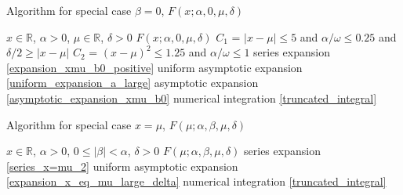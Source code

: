 \documentclass[10pt,a4paper,oneside]{article}
\numberwithin{equation}{section}
\begin{document}
{\centering
\begin{minipage}{.8\linewidth}
  \begin{algorithm}[H]
  \small
  \caption{Algorithm for special case $\beta = 0$, $F(x; \alpha, 0, \mu, \delta)$}\label{alg:case_beta_eq_zero}
\begin{algorithmic}
\Require $x \in \mathbb{R}$, $\alpha > 0$, $\mu \in \mathbb{R}$, $\delta > 0$
\Ensure $F(x; \alpha, 0, \mu, \delta)$
\State $C_1$ = $|x-\mu| \le 5$ and $\alpha / \omega \le 0.25$ and $\delta/2 \ge |x-\mu| $
\State $C_2$ = $(x-\mu)^2 \le 1.25$ and $\alpha / \omega \le 1$
    \State series expansion \eqref{expansion_xmu_b0_positive}
    \State uniform asymptotic expansion \eqref{uniform_expansion_a_large}
    \State asymptotic expansion \eqref{asymptotic_expansion_xmu_b0}
\Else
	\State numerical integration \eqref{truncated_integral}
\EndIf
\end{algorithmic}
  \end{algorithm}
\end{minipage}
\par
}


{\centering
\begin{minipage}{.85\linewidth}
  \begin{algorithm}[H]
  \small
  \caption{Algorithm for special case $x=\mu$, $F(\mu; \alpha, \beta, \mu, \delta)$}\label{alg:case_x_eq_mu}
\begin{algorithmic}
\Require $x \in \mathbb{R}$, $\alpha > 0$, $0 \le |\beta| < \alpha$, $\delta > 0$
\Ensure $F(\mu; \alpha, \beta, \mu, \delta)$
    \State series expansion \eqref{series_x=mu_2}
    \State uniform asymptotic expansion \eqref{expansion_x_eq_mu_large_delta}
\Else
	\State numerical integration \eqref{truncated_integral}
\EndIf
\end{algorithmic}
  \end{algorithm}
\end{minipage}
\par
}
\end{document}
